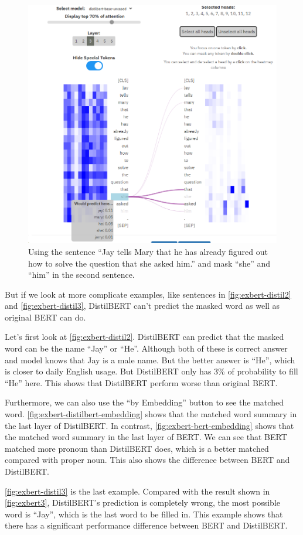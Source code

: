 \documentclass{article}[12pt]
\begin{document}
\begin{figure}[htbp]
	\centering
	\includegraphics[width=0.7\linewidth]{figure/exbert-distil3}
	\caption{Using the sentence ``Jay tells Mary that he has already figured out how to solve the question that she asked him.'' and mask ``she'' and ``him'' in the second sentence.}
	\label{fig:exbert-distil3}
\end{figure}

But if we look at more complicate examples, like sentences in \autoref{fig:exbert-distil2} and \autoref{fig:exbert-distil3}, DistilBERT can't predict the masked word as well as original BERT can do.

Let's first look at \autoref{fig:exbert-distil2}. DistilBERT can predict that the masked word can be the name ``Jay'' or ``He''. Although both of these is correct answer and model knows that Jay is a male name. But the better answer is ``He'', which is closer to daily English usage. But DistilBERT only has 3\% of probability to fill ``He'' here. This shows that DistilBERT perform worse than original BERT. 

Furthermore, we can also use the ``by Embedding'' button to see the matched word. \autoref{fig:exbert-distilbert-embedding} shows that the matched word summary in the last layer of DistilBERT. In contrast, \autoref{fig:exbert-bert-embedding} shows that the matched word summary in the last layer of BERT. We can see that BERT matched more pronoun than DistilBERT does, which is a better matched compared with proper noun. This also shows the difference between BERT and DistilBERT.

\autoref{fig:exbert-distil3} is the last example. Compared with the result shown in \autoref{fig:exbert3}, DistilBERT's prediction is completely wrong, the most possible word is ``Jay'', which is the last word to be filled in. This example shows that there has a significant performance difference between BERT and DistilBERT.
\end{document}
